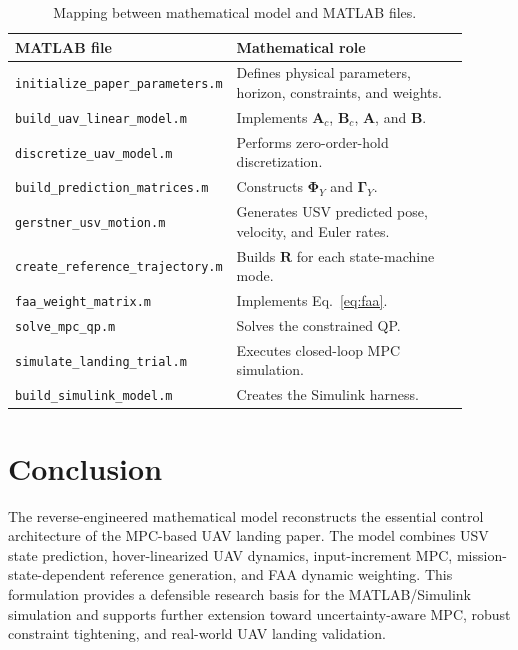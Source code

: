 \documentclass[12pt,a4paper]{article}
\begin{document}
\begin{table}[H]
\centering
\caption{Mapping between mathematical model and MATLAB files.}
\begin{tabular}{p{0.35\linewidth}p{0.55\linewidth}}
\toprule
MATLAB file & Mathematical role\\
\midrule
\texttt{initialize\_paper\_parameters.m} & Defines physical parameters, horizon, constraints, and weights.\\
\texttt{build\_uav\_linear\_model.m} & Implements $\bm{A}_c$, $\bm{B}_c$, $\bm{A}$, and $\bm{B}$.\\
\texttt{discretize\_uav\_model.m} & Performs zero-order-hold discretization.\\
\texttt{build\_prediction\_matrices.m} & Constructs $\bm{\Phi}_Y$ and $\bm{\Gamma}_Y$.\\
\texttt{gerstner\_usv\_motion.m} & Generates USV predicted pose, velocity, and Euler rates.\\
\texttt{create\_reference\_trajectory.m} & Builds $\bm{R}$ for each state-machine mode.\\
\texttt{faa\_weight\_matrix.m} & Implements Eq.~\eqref{eq:faa}.\\
\texttt{solve\_mpc\_qp.m} & Solves the constrained QP.\\
\texttt{simulate\_landing\_trial.m} & Executes closed-loop MPC simulation.\\
\texttt{build\_simulink\_model.m} & Creates the Simulink harness.\\
\bottomrule
\end{tabular}
\end{table}

\section{Conclusion}

The reverse-engineered mathematical model reconstructs the essential control architecture of the MPC-based UAV landing paper. The model combines USV state prediction, hover-linearized UAV dynamics, input-increment MPC, mission-state-dependent reference generation, and FAA dynamic weighting. This formulation provides a defensible research basis for the MATLAB/Simulink simulation and supports further extension toward uncertainty-aware MPC, robust constraint tightening, and real-world UAV landing validation.
\end{document}
